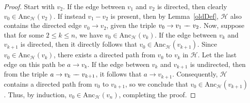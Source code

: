 \documentclass[accepted]{uai2025} %
\newcommand{\anc}{\text{Anc}}
\newcommand{\tuh}{\mathrel{\rightarrow}}
\newcommand{\tut}{\mathrel{{\relbar\mkern-9mu\relbar}}}
\begin{document}


\lemmaant*
\begin{proof}
Start with \( v_2 \). If the edge between \( v_1 \) and \( v_2 \) is directed, then clearly \( v_0 \in \anc_\mathcal{H}(v_2) \). If instead \( v_1 - v_2 \) is present, then by Lemma~\ref{oldDef}, \( \mathcal{H} \) also contains the directed edge \( v_0 \rightarrow v_2 \), given the triple \( v_0 \tuh v_1 \tut v_2 \). Now, suppose that for some \( 2 \leq k \leq n \), we have \( v_0 \in \anc_\mathcal{H}(v_k) \). If the edge between \( v_k \) and \( v_{k+1} \) is directed, then it directly follows that \( v_0 \in \anc_\mathcal{H}(v_{k+1}) \). Since \( v_0 \in \anc_\mathcal{H}(v_k) \), there exists a directed path from \( v_0 \) to \( v_k \) in \( \mathcal{H} \). Let the last edge on this path be \( a \rightarrow v_k \). If the edge between \( v_k \) and \( v_{k+1} \) is undirected, then from the triple \( a \tuh v_k \tut v_{k+1} \), it follows that \( a \tuh v_{k+1} \). Consequently, \( \mathcal{H} \) contains a directed path from \( v_0 \) to \( v_{k+1} \), so we conclude that \( v_0 \in \anc_\mathcal{H}(v_{k+1}) \). Thus, by induction, \( v_0 \in \anc_\mathcal{H}(v_n) \), completing the proof.
\end{proof}

\end{document}
